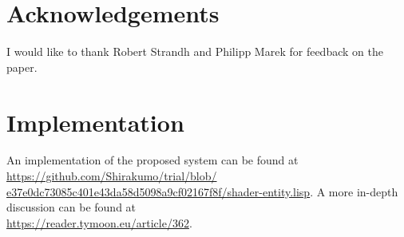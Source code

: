 \documentclass{sig-alternate}
\begin{document}
\section{Acknowledgements}\label{section:7}
I would like to thank Robert Strandh and Philipp Marek for feedback on the paper.

\section{Implementation}\label{section:8}
An implementation of the proposed system can be found at \href{https://github.com/Shirakumo/trial/blob/e37e0dc73085c401e43da58d5098a9cf02167f8f/shader-entity.lisp}{https://github.com/Shirakumo/trial/blob/\\e37e0dc73085c401e43da58d5098a9cf02167f8f/shader-entity.lisp}. A more in-depth discussion can be found at \\\url{https://reader.tymoon.eu/article/362}.


\end{document}

